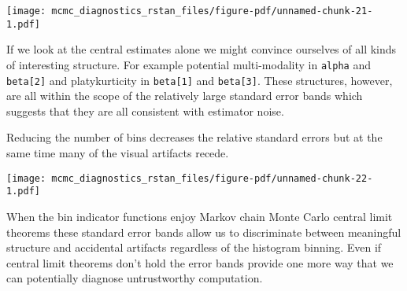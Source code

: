 \documentclass[
  letterpaper,
  DIV=11,
  numbers=noendperiod]{scrartcl}
\newenvironment{Shaded}{\begin{snugshade}}{\end{snugshade}}
\newcommand{\AttributeTok}[1]{\textcolor[rgb]{0.40,0.45,0.13}{#1}}
\newcommand{\DecValTok}[1]{\textcolor[rgb]{0.68,0.00,0.00}{#1}}
\newcommand{\FunctionTok}[1]{\textcolor[rgb]{0.28,0.35,0.67}{#1}}
\newcommand{\NormalTok}[1]{\textcolor[rgb]{0.00,0.23,0.31}{#1}}
\newcommand{\SpecialCharTok}[1]{\textcolor[rgb]{0.37,0.37,0.37}{#1}}
\newcommand{\StringTok}[1]{\textcolor[rgb]{0.13,0.47,0.30}{#1}}
\begin{document}
\texttt{[image: mcmc\_diagnostics\_rstan\_files/figure-pdf/unnamed-chunk-21-1.pdf]}

If we look at the central estimates alone we might convince ourselves of
all kinds of interesting structure. For example potential multi-modality
in \texttt{alpha} and \texttt{beta{[}2{]}} and platykurticity in
\texttt{beta{[}1{]}} and \texttt{beta{[}3{]}}. These structures,
however, are all within the scope of the relatively large standard error
bands which suggests that they are all consistent with estimator noise.

Reducing the number of bins decreases the relative standard errors but
at the same time many of the visual artifacts recede.

\begin{Shaded}
\end{Shaded}

\texttt{[image: mcmc\_diagnostics\_rstan\_files/figure-pdf/unnamed-chunk-22-1.pdf]}

When the bin indicator functions enjoy Markov chain Monte Carlo central
limit theorems these standard error bands allow us to discriminate
between meaningful structure and accidental artifacts regardless of the
histogram binning. Even if central limit theorems don't hold the error
bands provide one more way that we can potentially diagnose
untrustworthy computation.
\end{document}
